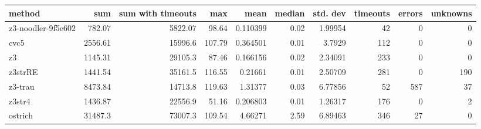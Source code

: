 \begin{tabular}{lrrrrrrrrr}
\hline
 method             &      sum &   sum with timeouts &    max &     mean &   median &   std. dev &   timeouts &   errors &   unknowns \\
\hline
 z3-noodler-9f5e602 &   782.07 &             5822.07 &  98.64 & 0.110399 &     0.02 &    1.99954 &         42 &        0 &          0 \\
 cvc5               &  2556.61 &            15996.6  & 107.79 & 0.364501 &     0.01 &    3.7929  &        112 &        0 &          0 \\
 z3                 &  1145.31 &            29105.3  &  87.46 & 0.166156 &     0.02 &    2.34091 &        233 &        0 &          0 \\
 z3strRE            &  1441.54 &            35161.5  & 116.55 & 0.21661  &     0.01 &    2.50709 &        281 &        0 &        190 \\
 z3-trau            &  8473.84 &            14713.8  & 119.63 & 1.31377  &     0.03 &    6.77856 &         52 &      587 &         37 \\
 z3str4             &  1436.87 &            22556.9  &  51.16 & 0.206803 &     0.01 &    1.26317 &        176 &        0 &          2 \\
 ostrich            & 31487.3  &            73007.3  & 109.54 & 4.66271  &     2.59 &    6.89463 &        346 &       27 &          0 \\
\hline
\end{tabular}
